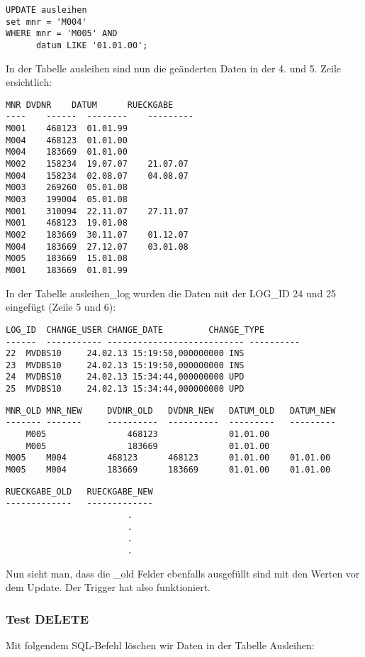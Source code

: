 \documentclass[11pt,a4paper,parskip=half]{scrartcl}
\begin{document}
\begin{lstlisting}
UPDATE ausleihen
set mnr = 'M004'
WHERE mnr = 'M005' AND 
      datum LIKE '01.01.00';
\end{lstlisting}

In der Tabelle ausleihen sind nun die geänderten Daten in der 4. und 5. Zeile ersichtlich:

\begin{lstlisting}
MNR	DVDNR	 DATUM		RUECKGABE
---- 	------	-------- 	---------
M001	468123 	01.01.99	
M004	468123	01.01.00	
M004	183669	01.01.00	
M002	158234 	19.07.07	21.07.07  
M004	158234 	02.08.07	04.08.07  
M003	269260 	05.01.08	
M003	199004 	05.01.08	
M001	310094 	22.11.07	27.11.07  
M001	468123 	19.01.08	
M002	183669 	30.11.07	01.12.07  
M004	183669 	27.12.07	03.01.08  
M005	183669	15.01.08	
M001	183669	01.01.99	
\end{lstlisting}

In der Tabelle ausleihen\_log wurden die Daten mit der LOG\_ID 24 und 25 eingefügt (Zeile 5 und 6):

\begin{lstlisting}
LOG_ID	CHANGE_USER	CHANGE_DATE			CHANGE_TYPE	
------	-----------	---------------------------	----------		
22	MVDBS10		24.02.13 15:19:50,000000000	INS					
23	MVDBS10		24.02.13 15:19:50,000000000	INS					
24	MVDBS10		24.02.13 15:34:44,000000000	UPD					
25	MVDBS10		24.02.13 15:34:44,000000000	UPD					
\end{lstlisting}

\begin{lstlisting}
MNR_OLD	MNR_NEW		DVDNR_OLD	DVDNR_NEW	DATUM_OLD	DATUM_NEW	
-------	-------		----------	----------	---------	--------- 	
	M005				468123				01.01.00					
	M005				183669				01.01.00					
M005	M004		468123		468123		01.01.00	01.01.00				
M005	M004		183669		183669		01.01.00	01.01.00				
\end{lstlisting}
\begin{lstlisting}
RUECKGABE_OLD	RUECKGABE_NEW
-------------	-------------	
						.
						.
						.
						.
\end{lstlisting}

Nun sieht man, dass die \_old Felder ebenfalls ausgefüllt sind mit den Werten vor dem Update. Der Trigger hat also funktioniert.

\subsubsection{Test DELETE}
Mit folgendem SQL-Befehl löschen wir Daten in der Tabelle Ausleihen:
\end{document}
